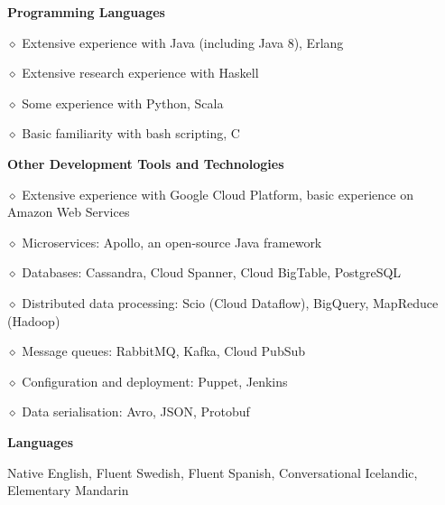 \bigskip

\medskip
{}
\medskip
{}

\bigskip


{\bf Programming Languages} 
\parindent=20pt
\item{$\diamond$} Extensive experience with Java (including Java 8), Erlang
\item{$\diamond$} Extensive research experience with Haskell
\item{$\diamond$} Some experience with Python, Scala
\item{$\diamond$} Basic familiarity with bash scripting, C
\parindent=0pt

\medskip

{\bf Other Development Tools and Technologies} 
\parindent=20pt
\item{$\diamond$} Extensive experience with Google Cloud Platform, basic experience on Amazon Web Services
\item{$\diamond$} Microservices: Apollo, an open-source Java framework
\item{$\diamond$} Databases: Cassandra, Cloud Spanner, Cloud BigTable, PostgreSQL
\item{$\diamond$} Distributed data processing: Scio (Cloud Dataflow), BigQuery, MapReduce (Hadoop)
\item{$\diamond$} Message queues: RabbitMQ, Kafka, Cloud PubSub
\item{$\diamond$} Configuration and deployment: Puppet, Jenkins
\item{$\diamond$} Data serialisation: Avro, JSON, Protobuf
\parindent=0pt

\medskip

{\bf Languages}

Native English, Fluent Swedish, Fluent Spanish, Conversational Icelandic, Elementary Mandarin

